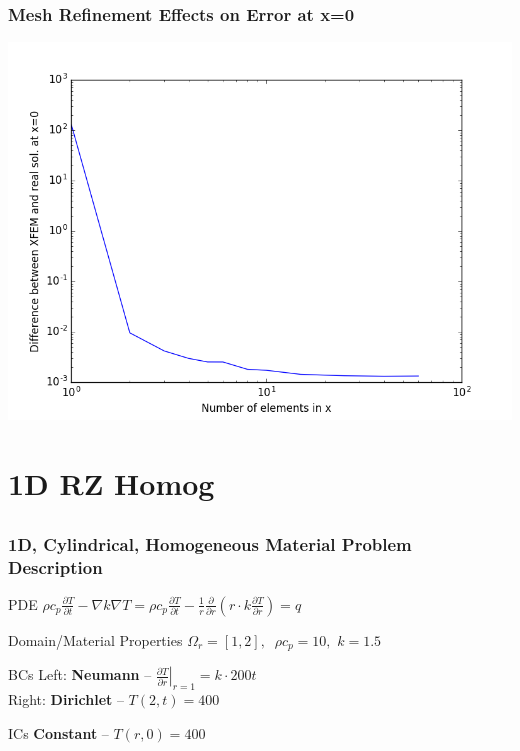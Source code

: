 \documentclass[]{beamer}
\begin{document}
\begin{frame}[t]\frametitle{Mesh Refinement Effects on Error at x=0}
	\begin{center}
		\includegraphics[scale=0.4]{figures/1D_xy_ls1m/1D_xy_ls1mat_neumann_comp}
	\end{center}
\end{frame}

\section{1D RZ Homog}
\subsection{}
\begin{frame}[t]\frametitle{1D, Cylindrical, Homogeneous Material Problem Description}
  \begin{block}{PDE}
    $\rho c_p\frac{\partial T}{\partial t} - \nabla k \nabla T = \rho c_p\frac{\partial T}{\partial t} - \frac{1}{r} \frac{\partial}{\partial r}\left(r\cdot k \frac{\partial T}{\partial r} \right) = q$
  \end{block}
  
  \begin{block}{Domain/Material Properties}
  	$\Omega_r = [1,2], \,\,\ \rho c_p = 10, \,\, k = 1.5$
  \end{block}
  
  \begin{block}{BCs}
    Left:  \textbf{Neumann} -- $\left. \frac{\partial T}{\partial r}\right|_{r=1} = k \cdot 200t$ \\
    Right: \textbf{Dirichlet} -- $T(2,t) = 400$
  \end{block}
  
  \begin{block}{ICs}
    \textbf{Constant} -- $T(r,0) = 400$
  \end{block}
\end{frame}
\end{document}
